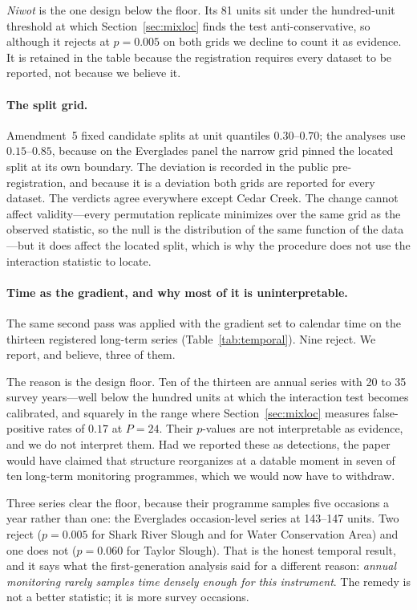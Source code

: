 \documentclass[review,12pt,authoryear]{elsarticle}
\theoremstyle{remark}
\begin{document}
\emph{Niwot} is the one design below the floor. Its 81 units sit under the
hundred-unit threshold at which Section~\ref{sec:mixloc} finds the test
anti-conservative, so although it rejects at $p = 0.005$ on both grids we
decline to count it as evidence. It is retained in the table because the
registration requires every dataset to be reported, not because we believe
it.

\paragraph{The split grid.} Amendment~5 fixed candidate splits at unit
quantiles $0.30$--$0.70$; the analyses use $0.15$--$0.85$, because on the
Everglades panel the narrow grid pinned the located split at its own
boundary. The deviation is recorded in the public pre-registration, and
because it is a deviation both grids are reported for every dataset. The
verdicts agree everywhere except Cedar Creek. The change cannot affect
validity---every permutation replicate minimizes over the same grid as the
observed statistic, so the null is the distribution of the same function of
the data---but it does affect the located split, which is why the procedure
does not use the interaction statistic to locate.

\paragraph{Time as the gradient, and why most of it is uninterpretable.}
The same second pass was applied with the gradient set to calendar time on
the thirteen registered long-term series (Table~\ref{tab:temporal}). Nine
reject. We report, and believe, three of them.

The reason is the design floor. Ten of the thirteen are annual series with
20 to 35 survey years---well below the hundred units at which the
interaction test becomes calibrated, and squarely in the range where
Section~\ref{sec:mixloc} measures false-positive rates of $0.17$ at
$P = 24$. Their $p$-values are not interpretable as evidence, and we do not
interpret them. Had we reported these as detections, the paper would have
claimed that structure reorganizes at a datable moment in seven of ten
long-term monitoring programmes, which we would now have to withdraw.

Three series clear the floor, because their programme samples five
occasions a year rather than one: the Everglades occasion-level series at
143--147 units. Two reject ($p = 0.005$ for Shark River Slough and for
Water Conservation Area) and one does not ($p = 0.060$ for Taylor Slough).
That is the honest temporal result, and it says what the first-generation
analysis said for a different reason: \emph{annual monitoring rarely samples
time densely enough for this instrument}. The remedy is not a better
statistic; it is more survey occasions.
\end{document}
